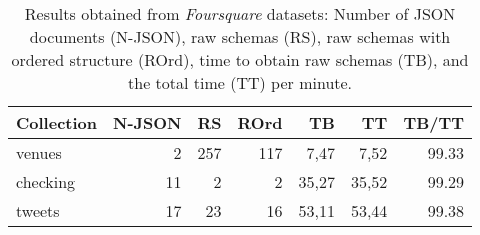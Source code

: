 
\begin{table}[ht]
  \caption{Results obtained from \textit{Foursquare} datasets: Number of JSON documents (N-JSON), raw schemas (RS), raw schemas with ordered structure (ROrd), time to obtain raw schemas (TB), and the total time  (TT) per minute.}
  \label{tab:foursquare}
  \begin{tabular}{lrrrrrr}
    \toprule
    Collection & N-JSON &  RS & ROrd &   TB &    TT & TB/TT \\
    \midrule
    venues     &      2 & 257 & 117 &  7,47 &  7,52 & 99.33 \\
    checking   &     11 &   2 &   2 & 35,27 & 35,52 & 99.29 \\
    tweets     &     17 &  23 &  16 & 53,11 & 53,44 & 99.38 \\
    \bottomrule
\end{tabular}
\end{table}